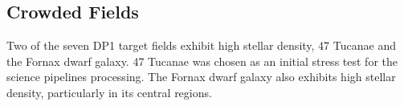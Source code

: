 \subsection{Crowded Fields}
Two of the seven \gls{DP1} target fields exhibit high stellar density, 47 Tucanae and the Fornax dwarf galaxy.
47 Tucanae was chosen as an initial stress test for the science pipelines processing.
The Fornax dwarf galaxy also exhibits high stellar density, particularly in its central regions.

